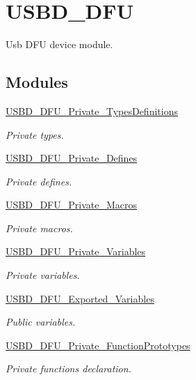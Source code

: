 \hypertarget{group__USBD__DFU}{}\section{U\+S\+B\+D\+\_\+\+D\+FU}
\label{group__USBD__DFU}


Usb D\+FU device module.  


\subsection*{Modules}
\begin{DoxyCompactItemize}
\item 
\hyperlink{group__USBD__DFU__Private__TypesDefinitions}{U\+S\+B\+D\+\_\+\+D\+F\+U\+\_\+\+Private\+\_\+\+Types\+Definitions}
\begin{DoxyCompactList}\small\item\em Private types. \end{DoxyCompactList}\item 
\hyperlink{group__USBD__DFU__Private__Defines}{U\+S\+B\+D\+\_\+\+D\+F\+U\+\_\+\+Private\+\_\+\+Defines}
\begin{DoxyCompactList}\small\item\em Private defines. \end{DoxyCompactList}\item 
\hyperlink{group__USBD__DFU__Private__Macros}{U\+S\+B\+D\+\_\+\+D\+F\+U\+\_\+\+Private\+\_\+\+Macros}
\begin{DoxyCompactList}\small\item\em Private macros. \end{DoxyCompactList}\item 
\hyperlink{group__USBD__DFU__Private__Variables}{U\+S\+B\+D\+\_\+\+D\+F\+U\+\_\+\+Private\+\_\+\+Variables}
\begin{DoxyCompactList}\small\item\em Private variables. \end{DoxyCompactList}\item 
\hyperlink{group__USBD__DFU__Exported__Variables}{U\+S\+B\+D\+\_\+\+D\+F\+U\+\_\+\+Exported\+\_\+\+Variables}
\begin{DoxyCompactList}\small\item\em Public variables. \end{DoxyCompactList}\item 
\hyperlink{group__USBD__DFU__Private__FunctionPrototypes}{U\+S\+B\+D\+\_\+\+D\+F\+U\+\_\+\+Private\+\_\+\+Function\+Prototypes}
\begin{DoxyCompactList}\small\item\em Private functions declaration. \end{DoxyCompactList}\end{DoxyCompactItemize}
